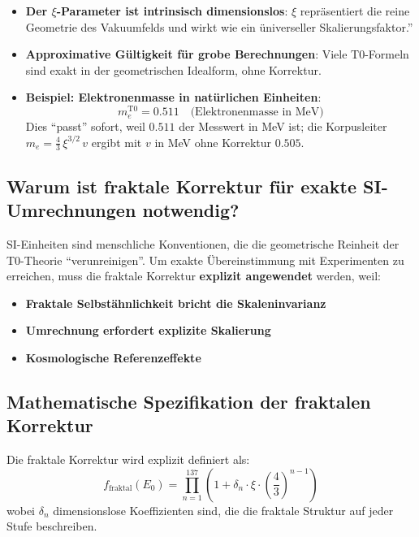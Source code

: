 	\begin{itemize}
		\item \textbf{Der $\xi$-Parameter ist intrinsisch dimensionslos}: $\xi$ repräsentiert die reine Geometrie des Vakuumfelds und wirkt wie ein üniverseller Skalierungsfaktor.''
		
		\item \textbf{Approximative Gültigkeit für grobe Berechnungen}: Viele T0-Formeln sind exakt in der geometrischen Idealform, ohne Korrektur.
		
		\item \textbf{Beispiel: Elektronenmasse in natürlichen Einheiten}:
		\begin{equation}
			m_e^{\mathrm{T0}} = 0.511 \quad \text{(Elektronenmasse in MeV)}
		\end{equation}
		Dies ``passt'' sofort, weil $0.511$ der Messwert in MeV ist; die Korpusleiter $m_e = \frac43\,\xi^{3/2}\,v$ ergibt mit $v$ in MeV ohne Korrektur $0.505$.
	\end{itemize}
	
	\subsection{Warum ist fraktale Korrektur für exakte SI-Umrechnungen notwendig?}
	
	SI-Einheiten sind menschliche Konventionen, die die geometrische Reinheit der T0-Theorie ``verunreinigen''. Um exakte Übereinstimmung mit Experimenten zu erreichen, muss die fraktale Korrektur \textbf{explizit angewendet} werden, weil:
	
	\begin{itemize}
		\item \textbf{Fraktale Selbstähnlichkeit bricht die Skaleninvarianz}
		\item \textbf{Umrechnung erfordert explizite Skalierung}
		\item \textbf{Kosmologische Referenzeffekte}
	\end{itemize}
	
	\subsection{Mathematische Spezifikation der fraktalen Korrektur}
	
	Die fraktale Korrektur wird explizit definiert als:
	\begin{equation}
		f_{\text{fraktal}}(E_0) = \prod_{n=1}^{137} \left(1 + \delta_n \cdot \xi \cdot \left(\frac{4}{3}\right)^{n-1}\right)
	\end{equation}
	wobei $\delta_n$ dimensionslose Koeffizienten sind, die die fraktale Struktur auf jeder Stufe beschreiben.
	
